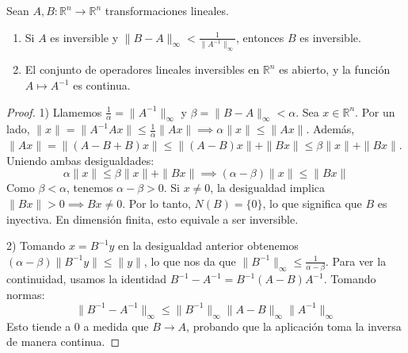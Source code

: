 \begin{lemma}
    Sean \(A, B: \mathbb{R}^n \to \mathbb{R}^n\) transformaciones lineales.
    \begin{enumerate}
        \item Si \(A\) es inversible y \(\| B - A \|_{\infty} < \frac{1}{\| A^{-1} \|_{\infty}}\), entonces \(B\) es inversible.
        \item El conjunto de operadores lineales inversibles en \(\mathbb{R}^n\) es abierto, y la función \(A \mapsto A^{-1}\) es continua.
    \end{enumerate}
\end{lemma}
\begin{proof}
    1) Llamemos \(\frac{1}{\alpha} = \|A^{-1}\|_\infty\) y \(\beta = \|B-A\|_\infty < \alpha\). Sea \(x \in \mathbb{R}^n\).
    Por un lado, \(\|x\| = \|A^{-1}Ax\| \le \frac{1}{\alpha}\|Ax\| \implies \alpha\|x\| \le \|Ax\|\).
    Además, \(\|Ax\| = \|(A-B+B)x\| \le \|(A-B)x\| + \|Bx\| \le \beta\|x\| + \|Bx\|\).
    Uniendo ambas desigualdades:
    \[ \alpha\|x\| \le \beta\|x\| + \|Bx\| \implies (\alpha-\beta)\|x\| \le \|Bx\| \]
    Como \(\beta < \alpha\), tenemos \(\alpha - \beta > 0\). Si \(x \neq 0\), la desigualdad implica \(\|Bx\| > 0 \implies Bx \neq 0\). Por lo tanto, \(N(B) = \{0\}\), lo que significa que \(B\) es inyectiva. En dimensión finita, esto equivale a ser inversible.

    2) Tomando \(x = B^{-1}y\) en la desigualdad anterior obtenemos \((\alpha - \beta)\|B^{-1}y\| \le \|y\|\), lo que nos da que \(\|B^{-1}\|_\infty \le \frac{1}{\alpha-\beta}\). Para ver la continuidad, usamos la identidad \(B^{-1} - A^{-1} = B^{-1}(A-B)A^{-1}\).
    Tomando normas:
    \[ \|B^{-1} - A^{-1}\|_\infty \le \|B^{-1}\|_\infty \|A-B\|_\infty \|A^{-1}\|_\infty \]
    Esto tiende a 0 a medida que \(B \to A\), probando que la aplicación toma la inversa de manera continua.
\end{proof}